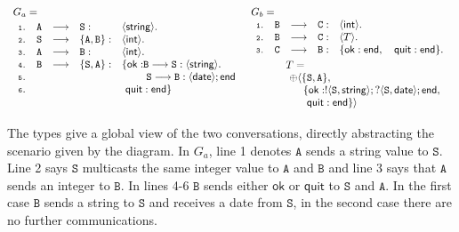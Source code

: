 \documentclass[a4paper,11pt,twoside]{report}
\newcommand{\kf}[1]{\textup{\textsf{#1}}\xspace}
\newcommand{\participant}[1]{\ensuremath{\mathtt{#1}}}
\newcommand{\redsym}{\ensuremath{\longrightarrow}}
\newcommand{\End}{\kf{end}}
\begin{document}
{\small
$
\begin{array}{ll}
G_a =&  G_b =\\
\begin{array}{llllll}
 \nm{1}& \participant{A} & \redsym & \participant{S}: & \langle \kf{string}\rangle.\\
  \nm{2}&\participant{S}  & \redsym & \{\participant{A},\participant{B}\}: & \langle \mathsf{int}\rangle .\\
  \nm{3}&\participant{A} & \redsym & \participant{B}:& \langle \mathsf{int}\rangle .\\
  \nm{4}&\participant{B} & \redsym & \{\participant{S},\participant{A}\}: & \{\mathsf{ok:}
 \participant{B} \redsym \participant{S}:\langle \kf{string}\rangle.\\
 \nm{5}& & & & \quad\quad \ \participant{S} \redsym
\participant{B}:
\langle \kf{date}\rangle ;\End\\
\nm{6} & & & & \ \mathsf{quit}: \End\}\\
\\
\end{array}
&
\begin{array}{llllll}
 \nm{1} & \participant{B}& \redsym & \participant{C}:&\langle \kf{int}\rangle .\\
 \nm{2}      &\participant{B}& \redsym & \participant{C}:&\langle T \rangle .\\
 \nm{3}     &\participant{C}& \redsym & \participant{B}: &
\{\mathsf{ok}:
\End, \quad \mathsf{quit}: \End\}.\\[1mm]
 & & & & \hspace{-1.8cm}
T=\\
 & & & & \hspace{-1.8cm}\
\oplus \langle\{\participant{S},\participant{A}\},\\
 & & & & \hspace{-1.8cm} \  \ \ \ \ \{\mathsf{ok}:!\langle
\participant{S},\kf{string}\rangle; ?\langle
\participant{S},
\kf{date}\rangle;
\End,\\
 & & & & \hspace{-1.8cm} \ \ \ \ \ \ \mathsf{quit}: \End\}\rangle\\[0.5mm]
\end{array}
\end{array}
$\\[0.5mm]
}

The types give a global view of the two conversations, directly abstracting the scenario given by the diagram. In $G_a$, line 1 denotes $\participant{A}$ sends a string value to $\participant{S}$. Line 2 says $\participant{S}$ multicasts the same integer value to $\participant{A}$ and $\participant{B}$ and line 3 says that $\participant{A}$ sends an integer to $\participant{B}$. In lines 4-6 $\participant{B}$ sends either $\mathsf{ok}$ or $\mathsf{quit}$ to $\participant{S}$ and $\participant{A}$. In the first case $\participant{B}$ sends a string to $\participant{S}$ and receives a date from $\participant{S}$, in the second case there are no further communications.
\end{document}
